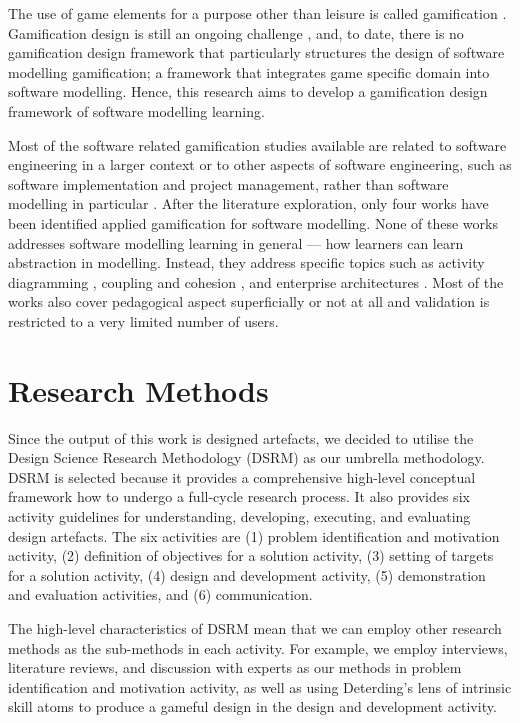\documentclass[runningheads,a4paper]{llncs}
\begin{document}
The use of game elements for a purpose other than leisure is called gamification \cite{deterding2011game}. Gamification design is still an ongoing challenge \cite{Deterding2013}, and, to date, there is no gamification design framework that particularly structures the design of software modelling gamification; a framework that integrates game specific domain into software modelling. Hence, this research aims to develop a gamification design framework of software modelling learning.

Most of the software related gamification studies available are related to software engineering in a larger context or to other aspects of software engineering, such as software implementation and project management, rather than software modelling in particular \cite{Pedreira2015}. After the literature exploration, only four works have been identified applied gamification for software modelling. None of these works addresses software modelling learning in general --- how learners can learn abstraction in modelling. Instead, they address specific topics such as activity diagramming \cite{Richardsen2014}, coupling and cohesion \cite{Stikkolorum2014}, and enterprise architectures \cite{Groenewegen2010} \cite{Ionita2015}. Most of the works also cover pedagogical aspect superficially or not at all and validation is restricted to a very limited number of users.

\section{Research Methods}
Since the output of this work is designed artefacts, we decided to utilise the Design Science Research Methodology (DSRM) \cite{peffers2007design} as our umbrella methodology. DSRM is selected because it provides a comprehensive high-level conceptual framework how to undergo a full-cycle research process. It also provides six activity guidelines for understanding, developing, executing, and evaluating design artefacts. The six activities are (1) problem identification and motivation activity, (2) definition of objectives for a solution activity, (3) setting of targets for a solution activity, (4) design and development activity, (5) demonstration and evaluation activities, and (6) communication. 

The high-level characteristics of DSRM mean that we can employ other research methods as the sub-methods in each activity. For example, we employ interviews, literature reviews, and discussion with experts as our methods in problem identification and motivation activity, as well as using Deterding's lens of intrinsic skill atoms \cite{deterding2015lens} to produce a gameful design in the design and development activity.
\end{document}
